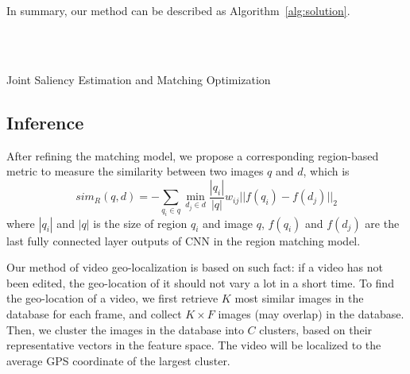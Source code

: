 In summary, our method can be described as Algorithm~\ref{alg:solution}.
\begin{algorithm}
\begin{algorithmic}[1]  
\\
~\\
\ENDWHILE
{}
\end{algorithmic}
\caption{Joint Saliency Estimation and Matching Optimization}
\label{alg:solution}
\end{algorithm}

\subsection{Inference}
After refining the matching model, we propose a corresponding region-based metric to measure the similarity between two images $q$ and $d$, which is 
\begin{equation}
sim_R(q,d) = -\sum_{q_i \in q} \min_{d_j\in d} \frac{|q_i|}{|q|} w_{ij}||f(q_i)-f(d_j)||_2
\label{eq:simR}
\end{equation}
where $|q_i|$ and $|q|$ is the size of region $q_i$ and image $q$, $f(q_i)$ and $f(d_j)$ are the last fully connected layer outputs of CNN in the region matching model. 

Our method of video geo-localization is based on such fact: if a video has not been edited, the geo-location of it should not vary a lot in a short time. 
To find the geo-location of a video, we first retrieve $K$ most similar images in the database for each frame, and collect $K\times F$ images (may overlap) in the database. 
Then, we cluster the images in the database into $C$ clusters, based on their representative vectors in the feature space. 
The video will be localized to the average GPS coordinate of the largest cluster.
